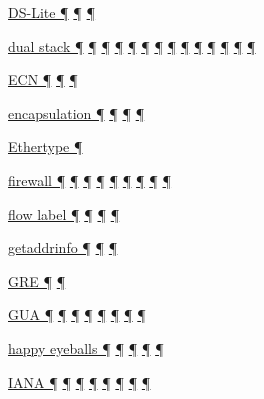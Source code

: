 \documentclass[
]{article}
\begin{document}
\hyperref[dual-stack-scenarios]{DS-Lite ¶}
\hyperref[translation-and-ipv4-as-a-service]{¶} \hyperref[tunnels]{¶}

\hyperref[how-an-application-programmer-sees-ipv6]{dual stack ¶}
\hyperref[routing]{¶} \hyperref[transport-protocols]{¶}
\hyperref[coexistence-with-legacy-ipv4]{¶}
\hyperref[dual-stack-scenarios]{¶}
\hyperref[translation-and-ipv4-as-a-service]{¶} \hyperref[tunnels]{¶}
\hyperref[network-design]{¶} \hyperref[address-and-prefix-management]{¶}
\hyperref[energy-consumption]{¶} \hyperref[cern-and-the-lhc]{¶}
\hyperref[deployment-in-the-home]{¶} \hyperref[troubleshooting]{¶}
\hyperref[advanced-troubleshooting]{¶}

\hyperref[packet-format]{ECN ¶}
\hyperref[traffic-class-and-flow-label]{¶}
\hyperref[transport-protocols]{¶}

\hyperref[layer-2-functions]{encapsulation ¶}
\hyperref[dual-stack-scenarios]{¶}
\hyperref[translation-and-ipv4-as-a-service]{¶} \hyperref[tunnels]{¶}

\hyperref[layer-2-functions]{Ethertype ¶}

\hyperref[extension-headers-and-options]{firewall ¶}
\hyperref[dual-stack-scenarios]{¶} \hyperref[security]{¶}
\hyperref[topology-obfuscation]{¶} \hyperref[network-design]{¶}
\hyperref[address-and-prefix-management]{¶}
\hyperref[benchmarking-and-monitoring]{¶} \hyperref[multihoming]{¶}
\hyperref[advanced-troubleshooting]{¶}

\hyperref[packet-format]{flow label ¶} \hyperref[routing]{¶}
\hyperref[traffic-class-and-flow-label]{¶} \hyperref[markdown-usage]{¶}

\hyperref[how-an-application-programmer-sees-ipv6]{getaddrinfo ¶}
\hyperref[dns]{¶} \hyperref[dual-stack-scenarios]{¶}

\hyperref[layer-2-functions]{GRE ¶} \hyperref[tunnels]{¶}

\hyperref[addresses]{GUA ¶} \hyperref[auto-configuration]{¶}
\hyperref[source-and-destination-address-selection]{¶}
\hyperref[ipv6-primary-differences-from-ipv4]{¶}
\hyperref[translation-and-ipv4-as-a-service]{¶}
\hyperref[topology-obfuscation]{¶} \hyperref[address-planning]{¶}
\hyperref[multi-prefix-operation]{¶}

\hyperref[how-an-application-programmer-sees-ipv6]{happy eyeballs ¶}
\hyperref[multihoming]{¶} \hyperref[deployment-in-the-home]{¶}
\hyperref[troubleshooting]{¶} \hyperref[advanced-troubleshooting]{¶}

\hyperref[why-version-6]{IANA ¶} \hyperref[addresses]{¶}
\hyperref[auto-configuration]{¶}
\hyperref[extension-headers-and-options]{¶}
\hyperref[managed-configuration]{¶} \hyperref[packet-format]{¶}
\hyperref[filtering]{¶} \hyperref[obsolete-features-in-ipv6]{¶}
\end{document}
